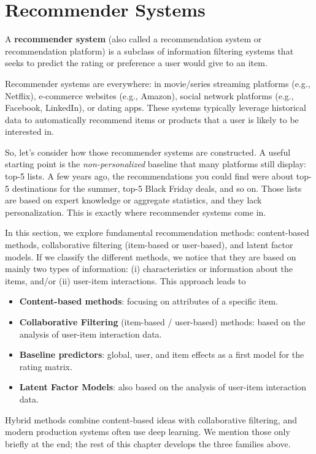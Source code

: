 \documentclass[
]{book}
\begin{document}
\chapter{Recommender Systems}\label{recommender-systems}

A \textbf{recommender system} (also called a recommendation system or recommendation platform) is a subclass of information filtering systems that seeks to predict the rating or preference a user would give to an item.

Recommender systems are everywhere: in movie/series streaming platforms (e.g., Netflix), e-commerce websites (e.g., Amazon), social network platforms (e.g., Facebook, LinkedIn), or dating apps. These systems typically leverage historical data to automatically recommend items or products that a user is likely to be interested in.

So, let's consider how those recommender systems are constructed. A useful starting point is the \emph{non-personalized} baseline that many platforms still display: top-5 lists. A few years ago, the recommendations you could find were about top-5 destinations for the summer, top-5 Black Friday deals, and so on. Those lists are based on expert knowledge or aggregate statistics, and they lack personalization. This is exactly where recommender systems come in.

In this section, we explore fundamental recommendation methods: content-based methods, collaborative filtering (item-based or user-based), and latent factor models. If we classify the different methods, we notice that they are based on mainly two types of information: (i) characteristics or information about the items, and/or (ii) user-item interactions. This approach leads to

\begin{itemize}
\item
  \textbf{Content-based methods}: focusing on attributes of a specific item.
\item
  \textbf{Collaborative Filtering} (item-based / user-based) methods: based on the analysis of user-item interaction data.
\item
  \textbf{Baseline predictors}: global, user, and item effects as a first model for the rating matrix.
\item
  \textbf{Latent Factor Models}: also based on the analysis of user-item interaction data.
\end{itemize}

Hybrid methods combine content-based ideas with collaborative filtering, and modern production systems often use deep learning. We mention those only briefly at the end; the rest of this chapter develops the three families above.
\end{document}
